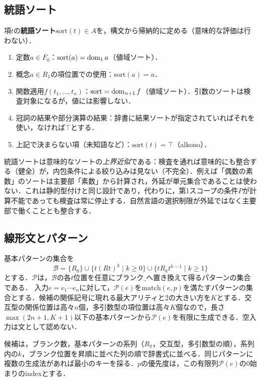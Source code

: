 \documentclass[../../main-detail.tex]{subfiles}
\begin{document}
\subsection{統語ソート}
\begin{definition}[統語ソート]
    項$t$の\textbf{統語ソート}$\mathrm{sort}(t) \in A$を，構文から帰納的に定める（意味的な評価は行わない）．
    \begin{enumerate}[label=(\arabic*)]
        \item 定数$a \in F_0$：$\mathrm{sort}(a) = \mathop{\mathrm{dom}}\nolimits_1 a$（値域ソート）．
        \item 概念$a \in R_1$の項位置での使用：$\mathrm{sort}(a) = a$．
        \item 関数適用$f(t_1,\ldots,t_n)$：$\mathrm{sort} = \mathop{\mathrm{dom}}\nolimits_{n+1} f$（値域ソート）．引数のソートは検査対象になるが，値には影響しない．
        \item 冠詞の結果や部分演算の結果：辞書に結果ソートが指定されていればそれを使い，なければ$\top$とする．
        \item 上記で決まらない項（未知語など）：$\mathrm{sort}(t) = \top$（alkono）．
    \end{enumerate}
\end{definition}
\begin{remark}
    統語ソートは意味的なソートの\emph{上界近似}である：検査を通れば意味的にも整合する（健全）が，内包条件による絞り込みは見ない（不完全）．例えば「偶数の素数」のソートは主要部「素数」から計算され，外延が単元集合であることは使わない．これは静的型付けと同じ設計であり，代わりに，第1スコープの条件$P$が計算不能であっても検査は常に停止する．自然言語の選択制限が外延ではなく主要部で働くこととも整合する．
\end{remark}

\subsection{線形文とパターン}
基本パターンの集合を
\[
    \mathcal B=\{R_0\}\cup\{t(Rt)^k\mid k\geq0\}\cup\{tR_kt^{k-1}\mid k\geq1\}
\]
とする．$\mathcal P$は，$\mathcal B$の各$t$位置を任意にブランク$\_$へ置き換えて得るパターンの集合である．
入力$e=e_1\cdots e_n$に対して，$\mathcal P(e)$を$\mathrm{match}(e,p)$を満たすパターンの集合とする．候補の関係記号に現れる最大アリティと2の大きい方を$K$とする．交互型の関係位置は高々$n$個，多引数型の項位置は高々$K$個なので，長さ$\max(2n+1,K+1)$以下の基本パターンから$\mathcal P(e)$を有限に生成できる．空入力は文として認めない．

候補は，ブランク数，基本パターンの系列（$R_0$，交互型，多引数型の順），系列内の$k$，ブランク位置を昇順に並べた列の順で辞書式に並べる．同じパターンに複数の生成法があれば最小のキーを採る．$p$の優先度は，この有限列$\mathcal P(e)$の0始まりのindexとする．
\end{document}
